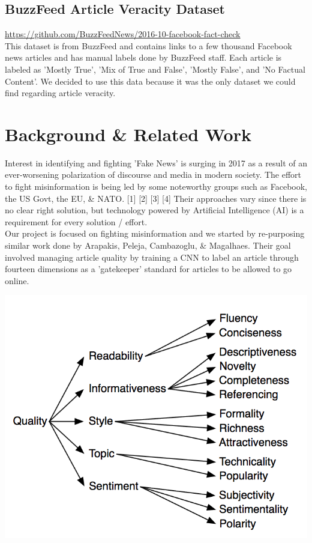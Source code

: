 \documentclass[11pt]{article}
\begin{document}
\subsection{BuzzFeed Article Veracity Dataset}
\url{https://github.com/BuzzFeedNews/2016-10-facebook-fact-check}\\

This dataset is from BuzzFeed and contains links to a few thousand Facebook news articles and has manual labels done by BuzzFeed staff. Each article is labeled as 'Mostly True', 'Mix of True and False', 'Mostly False', and 'No Factual Content'.  We decided to use this data because it was the only dataset we could find regarding article veracity.

\section{Background \& Related Work}
\indent \indent Interest in identifying and fighting 'Fake News' is surging in 2017 as a result of an ever-worsening polarization of discourse and media in modern society.  The effort to fight misinformation is being led by some noteworthy groups such as Facebook, the US Govt, the EU, \& NATO. [1] [2] [3] [4]  Their approaches vary since there is no clear right solution, but technology powered by Artificial Intelligence (AI) is a requirement for every solution / effort. \\
\indent Our project is focused on fighting misinformation and we started by re-purposing similar work done by Arapakis, Peleja, Cambazoglu, \& Magalhaes.  Their goal involved managing article quality by training a CNN to label an article through fourteen dimensions as a 'gatekeeper' standard for articles to be allowed to go online. 

\begin{center}
	\includegraphics[scale=0.6]{Dimensions.png}
\end{center}
\end{document}
